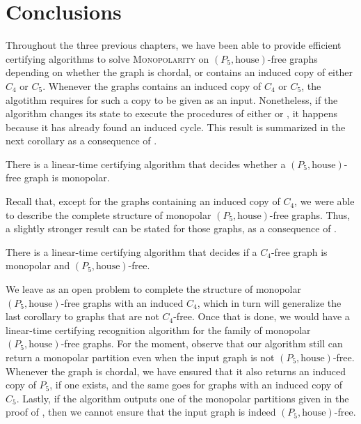 \chapter{Conclusions}

\renewcommand{\thetheorem}{\thechapter.\arabic{theorem}}
\setcounter{theorem}{0}

Throughout the three previous chapters, we have been able to provide efficient
certifying algorithms to solve \textsc{Monopolarity} on $(P_5,\text{house})$-free
graphs depending on whether the graph is chordal, or contains an induced copy of
either $C_4$ or $C_5$. Whenever the graphs contains an induced copy of $C_4$ or
$C_5$, the algotithm requires for such a copy to be given as an input.
Nonetheless, if the algorithm changes its state to execute the procedures of
either  or , it happens because it has already
found an induced cycle. This result is summarized in the next corollary as a
consequence of .

\begin{corollary}
    There is a linear-time certifying algorithm that decides whether a
    $(P_5,\text{house})$-free graph is monopolar.
\end{corollary}

Recall that, except for the graphs containing an induced copy of $C_4$, we were
able to describe the complete structure of monopolar $(P_5,\text{house})$-free
graphs. Thus, a slightly stronger result can be stated for those graphs, as a
consequence of .

\begin{corollary}
    There is a linear-time certifying algorithm that decides if a $C_4$-free
    graph is monopolar and $(P_5,\text{house})$-free.
\end{corollary}

We leave as an open problem to complete the structure of monopolar $(P_5,
\text{house})$-free graphs with an induced $C_4$, which in turn will generalize
the last corollary to graphs that are not $C_4$-free. Once that is done, we
would have a linear-time certifying recognition algorithm for the family of
monopolar $(P_5,\text{house})$-free graphs. For the moment, observe that our
algorithm still can return a monopolar partition even when the input graph is
not $(P_5,\text{house})$-free. Whenever the graph is chordal, we have ensured
that it also returns an induced copy of $P_5$, if one exists, and the same goes
for graphs with an induced copy of $C_5$. Lastly, if the algorithm outputs one
of the monopolar partitions given in the proof of , then
we cannot ensure that the input graph is indeed $(P_5,\text{house})$-free.

